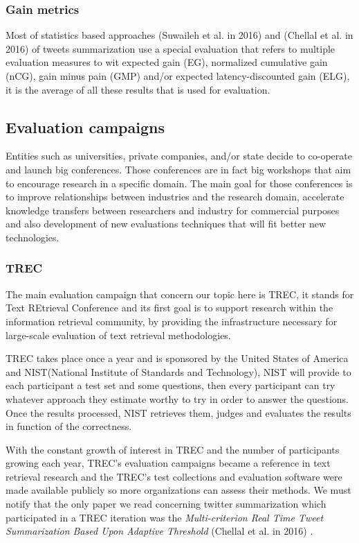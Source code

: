 \documentclass[runningheads]{llncs}
\begin{document}
\subsubsection{Gain metrics}

Most of statistics based approaches (Suwaileh et al. in 2016)
\cite{suwaileh_light-weight_nodate} and (Chellal et al. in 2016)
\cite{chellal_multi-criterion_2016} of tweets summarization use a special
evaluation that refers to multiple evaluation measures to wit expected gain
(EG), normalized cumulative gain (nCG), gain minus pain (GMP) and/or expected
latency-discounted gain (ELG), it is the average of all these results that is
used for evaluation.

\subsection{Evaluation campaigns}

Entities such as universities, private companies, and/or state decide to
co-operate and launch big conferences. Those conferences are in fact big
workshops that aim to encourage research in a specific domain. The main goal
for those conferences is to improve relationships between industries and the
research domain, accelerate knowledge transfers between researchers and
industry for commercial purposes and also development of new evaluations
techniques that will fit better new technologies.

\subsubsection{TREC}

The main evaluation campaign that concern our topic here is TREC, it stands for
Text REtrieval Conference and its first goal is to support research within the
information retrieval community, by providing the infrastructure necessary for
large-scale evaluation of text retrieval methodologies.

TREC takes place once a year and is sponsored by the United States of America
and NIST(National Institute of Standards and Technology), NIST will provide to
each participant a test set and some questions, then every participant can try
whatever approach they estimate worthy to try in order to answer the questions.
Once the results processed, NIST retrieves them, judges and evaluates the
results in function of the correctness.

With the constant growth of interest in TREC and the number of participants
growing each year, TREC's evaluation campaigns became a reference in text
retrieval research and the TREC's test collections and  evaluation software
were made available publicly so more organizations can assess their methods. We
must notify that the only paper we read concerning twitter summarization which
participated in a TREC iteration was the \textit{Multi-criterion Real Time
Tweet Summarization Based Upon Adaptive Threshold} (Chellal et al. in 2016)
\cite{chellal_multi-criterion_2016}.
\end{document}
